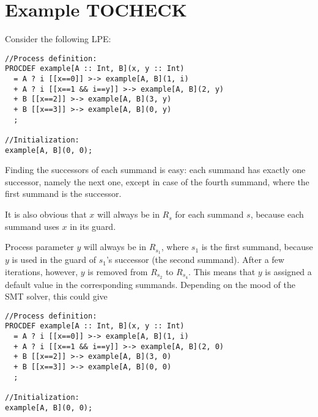 \section{Example TOCHECK}

Consider the following LPE:

\begin{lstlisting}
//Process definition:
PROCDEF example[A :: Int, B](x, y :: Int)
  = A ? i [[x==0]] >-> example[A, B](1, i)
  + A ? i [[x==1 && i==y]] >-> example[A, B](2, y)
  + B [[x==2]] >-> example[A, B](3, y)
  + B [[x==3]] >-> example[A, B](0, y)
  ;

//Initialization:
example[A, B](0, 0);
\end{lstlisting}

Finding the successors of each summand is easy: each summand has exactly one successor, namely the next one, except in case of the fourth summand, where the first summand is the successor.

It is also obvious that $x$ will always be in $R_s$ for each summand $s$, because each summand uses $x$ in its guard.

Process parameter $y$ will always be in $R_{s_1}$, where $s_1$ is the first summand, because $y$ is used in the guard of $s_1$'s successor (the second summand).
After a few iterations, however, $y$ is removed from $R_{s_2}$ to $R_{s_4}$.
This means that $y$ is assigned a default value in the corresponding summands.
Depending on the mood of the SMT solver, this could give

\begin{lstlisting}
//Process definition:
PROCDEF example[A :: Int, B](x, y :: Int)
  = A ? i [[x==0]] >-> example[A, B](1, i)
  + A ? i [[x==1 && i==y]] >-> example[A, B](2, 0)
  + B [[x==2]] >-> example[A, B](3, 0)
  + B [[x==3]] >-> example[A, B](0, 0)
  ;

//Initialization:
example[A, B](0, 0);
\end{lstlisting}





